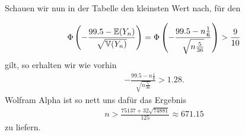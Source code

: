 \begin{solution}
Schauen wir nun in der Tabelle den kleinsten Wert nach, für den 

\begin{align*}
    \Phi\left ( -\frac{99.5-\mathbb{E}(Y_n)}{\sqrt{\mathbb{V}(Y_n)}} \right ) = \Phi\left ( -\frac{99.5-n\frac{1}{6}}{\sqrt{n\frac{5}{36}}} \right ) > \frac{9}{10}
\end{align*}
gilt, so erhalten wir wie vorhin
\begin{align*}
    -\frac{99.5-n\frac{1}{6}}{\sqrt{n\frac{5}{36}}} > 1.28.
\end{align*}
Wolfram Alpha ist so nett uns dafür das Ergebnis
\begin{align*}
    n > \frac{75137 + 32\sqrt{74881}}{125} \approx 671.15
\end{align*}
zu liefern.
\end{solution}
